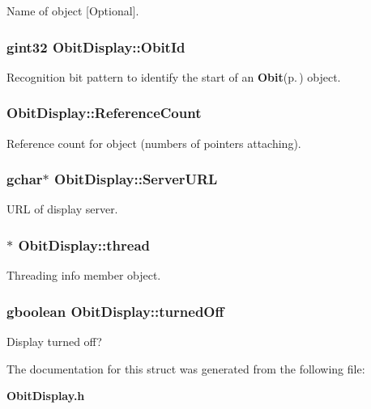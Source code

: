 Name of object [Optional]. 

\subsubsection{\setlength{\rightskip}{0pt plus 5cm}gint32 {\bf Obit\-Display::Obit\-Id}}\label{structObitDisplay_o0}


Recognition bit pattern to identify the start of an {\bf Obit}{\rm (p.\,\pageref{structObit})} object. 

\subsubsection{ {\bf Obit\-Display::Reference\-Count}}\label{structObitDisplay_o2}


Reference count for object (numbers of pointers attaching). 

\subsubsection{\setlength{\rightskip}{0pt plus 5cm}gchar$\ast$ {\bf Obit\-Display::Server\-URL}}\label{structObitDisplay_o5}


URL of display server. 

\subsubsection{$\ast$ {\bf Obit\-Display::thread}}\label{structObitDisplay_o4}


Threading info member object. 

\subsubsection{\setlength{\rightskip}{0pt plus 5cm}gboolean {\bf Obit\-Display::turned\-Off}}\label{structObitDisplay_o6}


Display turned off? 



The documentation for this struct was generated from the following file:\begin{CompactItemize}
\item 
{\bf Obit\-Display.h}\end{CompactItemize}
